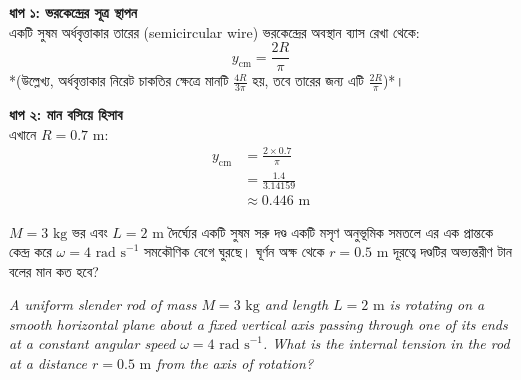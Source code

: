 \documentclass[12pt, a4paper]{article}
\begin{document}
\begin{tcolorbox}[solutionbox={সমাধান (Solution)}]
    \noindent
    \textbf{ধাপ ১: ভরকেন্দ্রের সূত্র স্থাপন} \\
    একটি সুষম অর্ধবৃত্তাকার তারের (semicircular wire) ভরকেন্দ্রের অবস্থান ব্যাস রেখা থেকে:
    \[ y_{\text{cm}} = \frac{2R}{\pi} \]
    *(উল্লেখ্য, অর্ধবৃত্তাকার নিরেট চাকতির ক্ষেত্রে মানটি $\frac{4R}{3\pi}$ হয়, তবে তারের জন্য এটি $\frac{2R}{\pi}$)*।
    
    \vspace{0.5em}
    \noindent\textbf{ধাপ ২: মান বসিয়ে হিসাব} \\
    এখানে $R = 0.7\text{ m}$:
    \begin{align*}
        y_{\text{cm}} &= \frac{2 \times 0.7}{\pi} \\
          &= \frac{1.4}{3.14159} \\
          &\approx \mathbf{0.446}\text{ m}
    \end{align*}
\end{tcolorbox}
\newpage

\begin{tcolorbox}[questionbox={প্রশ্ন (Question) 31}]
    \noindent
    $M = 3\text{ kg}$ ভর এবং $L = 2\text{ m}$ দৈর্ঘ্যের একটি সুষম সরু দণ্ড একটি মসৃণ অনুভূমিক সমতলে এর এক প্রান্তকে কেন্দ্র করে $\omega = 4\text{ rad s}^{-1}$ সমকৌণিক বেগে ঘুরছে। ঘূর্ণন অক্ষ থেকে $r = 0.5\text{ m}$ দূরত্বে দণ্ডটির অভ্যন্তরীণ টান বলের মান কত হবে?
    
    \vspace{0.8em}
    \begin{english}
    \noindent\textit{\color{darkgray}
    A uniform slender rod of mass $M = 3\text{ kg}$ and length $L = 2\text{ m}$ is rotating on a smooth horizontal plane about a fixed vertical axis passing through one of its ends at a constant angular speed $\omega = 4\text{ rad s}^{-1}$. What is the internal tension in the rod at a distance $r = 0.5\text{ m}$ from the axis of rotation?
    }
    \end{english}
\end{tcolorbox}
\end{document}
